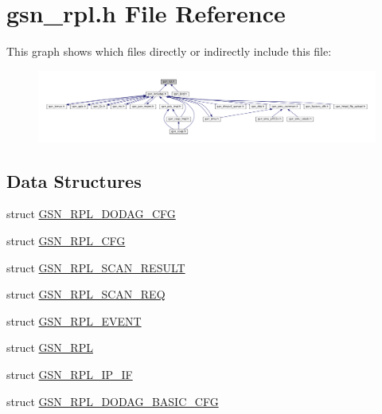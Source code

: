\hypertarget{a00579}{
\section{gsn\_\-rpl.h File Reference}
\label{a00579}
}
This graph shows which files directly or indirectly include this file:
\nopagebreak
\begin{figure}[H]
\begin{center}
\leavevmode
\includegraphics[width=400pt]{a00815}
\end{center}
\end{figure}
\subsection*{Data Structures}
\begin{DoxyCompactItemize}
\item 
struct \hyperlink{a00199}{GSN\_\-RPL\_\-DODAG\_\-CFG}
\item 
struct \hyperlink{a00197}{GSN\_\-RPL\_\-CFG}
\item 
struct \hyperlink{a00210}{GSN\_\-RPL\_\-SCAN\_\-RESULT}
\item 
struct \hyperlink{a00209}{GSN\_\-RPL\_\-SCAN\_\-REQ}
\item 
struct \hyperlink{a00200}{GSN\_\-RPL\_\-EVENT}
\item 
struct \hyperlink{a00192}{GSN\_\-RPL}
\item 
struct \hyperlink{a00203}{GSN\_\-RPL\_\-IP\_\-IF}
\item 
struct \hyperlink{a00198}{GSN\_\-RPL\_\-DODAG\_\-BASIC\_\-CFG}
\end{DoxyCompactItemize}
